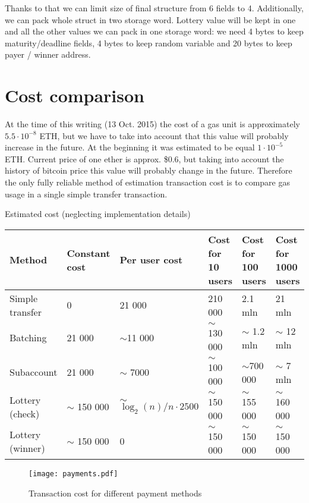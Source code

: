 \documentclass[a4paper]{article}
\begin{document}
        Thanks to that we can limit size of final structure from 6 fields to 4.  Additionally, we can pack whole struct
        in two storage word. Lottery value will be kept in one and all the other values we can pack in one storage
        word: we need 4 bytes to keep maturity/deadline fields, 4 bytes to keep random variable and 20 bytes to keep
        payer / winner address.

\section{Cost comparison}
\label{sec:cost}
    At the time of this writing (13 Oct. 2015) the cost of a gas unit is approximately  $5.5 \cdot 10^{-8}$ ETH, but
    we have to take into account that this value will probably increase in the future. At the beginning it was
    estimated to be equal $1 \cdot 10^{-5}$ ETH. Current price of one ether is approx. \$0.6, but taking into account
    the history of bitcoin price this value will probably change in the future. Therefore the only fully reliable
    method of estimation transaction cost is to compare gas usage in a single simple transfer transaction.

    Estimated cost (neglecting implementation details)

    \begin{tabular}{|p{8em}|p{5em}|p{8em}|p{5em}|p{5em}|p{5em}|}
        \hline
        Method & Constant cost & Per user cost & Cost for 10 users & Cost for 100 users & Cost for 1000 users \\ \hline
        Simple transfer & 0 & 21 000 & 210 000 & 2.1 mln & 21 mln \\ \hline
        Batching & 21 000 & $\sim$11 000 & $\sim$ 130 000 & $\sim$ 1.2 mln & $\sim$ 12 mln \\ \hline
        Subaccount & 21 000 & $\sim$ 7000 & $\sim$ 100 000 & $\sim$700 000 & $\sim$ 7 mln \\ \hline
        Lottery (check) & $\sim$ 150 000 & $\sim$ $\log_2(n)/n \cdot 2500 $ & $\sim$ 150 000 & $\sim$ 155 000 &
        $\sim$ 160 000 \\ \hline
        Lottery (winner) & $\sim$ 150 000 & 0 & $\sim$ 150 000 & $\sim$ 150 000 & $\sim$ 150 000 \\ \hline
    \end{tabular}

    \begin{figure}
        \centering
        \texttt{[image: payments.pdf]}
        \caption{Transaction cost for different payment methods}
        \label{fig:payment}
    \end{figure}
\end{document}
